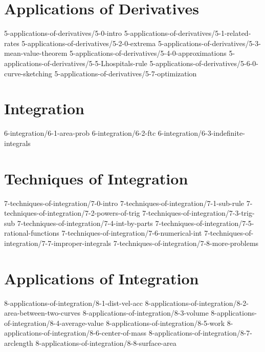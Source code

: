 \chapter{Applications of Derivatives}\label{chap:ApplicationsOfDerivatives}
	{5-applications-of-derivatives/5-0-intro}
	{5-applications-of-derivatives/5-1-related-rates}
	{5-applications-of-derivatives/5-2-0-extrema}
	{5-applications-of-derivatives/5-3-mean-value-theorem}
	{5-applications-of-derivatives/5-4-0-approximations}
	{5-applications-of-derivatives/5-5-Lhospitals-rule}
	{5-applications-of-derivatives/5-6-0-curve-sketching}
	{5-applications-of-derivatives/5-7-optimization}
	
\chapter{Integration}\label{chap:Integration}
	{6-integration/6-1-area-prob}
	{6-integration/6-2-ftc}
	{6-integration/6-3-indefinite-integrals}
	
\chapter{Techniques of Integration}\label{chap:TechniquesOfIntegration}
	{7-techniques-of-integration/7-0-intro}
	{7-techniques-of-integration/7-1-sub-rule}		
	{7-techniques-of-integration/7-2-powers-of-trig} 
	{7-techniques-of-integration/7-3-trig-sub} 
	{7-techniques-of-integration/7-4-int-by-parts} 
	{7-techniques-of-integration/7-5-rational-functions} 
	{7-techniques-of-integration/7-6-numerical-int} 
	{7-techniques-of-integration/7-7-improper-integrals}
	{7-techniques-of-integration/7-8-more-problems}  
	
\chapter{Applications of Integration}\label{chap:ApplicationsOfIntegration}	
	{8-applications-of-integration/8-1-dist-vel-acc}
	{8-applications-of-integration/8-2-area-between-two-curves}
	{8-applications-of-integration/8-3-volume}
	{8-applications-of-integration/8-4-average-value}
	{8-applications-of-integration/8-5-work}
	{8-applications-of-integration/8-6-center-of-mass}
	{8-applications-of-integration/8-7-arclength}
	{8-applications-of-integration/8-8-surface-area}
	

